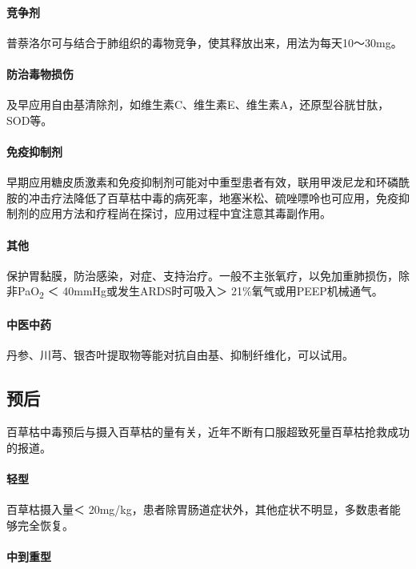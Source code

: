 \paragraph{竞争剂}

普萘洛尔可与结合于肺组织的毒物竞争，使其释放出来，用法为每天10～30mg。

\paragraph{防治毒物损伤}

及早应用自由基清除剂，如维生素C、维生素E、维生素A，还原型谷胱甘肽，SOD等。

\paragraph{免疫抑制剂}

早期应用糖皮质激素和免疫抑制剂可能对中重型患者有效，联用甲泼尼龙和环磷酰胺的冲击疗法降低了百草枯中毒的病死率，地塞米松、硫唑嘌呤也可应用，免疫抑制剂的应用方法和疗程尚在探讨，应用过程中宜注意其毒副作用。

\paragraph{其他}

保护胃黏膜，防治感染，对症、支持治疗。一般不主张氧疗，以免加重肺损伤，除非PaO\textsubscript{2}
＜ 40mmHg或发生ARDS时可吸入＞ 21\%氧气或用PEEP机械通气。

\paragraph{中医中药}

丹参、川芎、银杏叶提取物等能对抗自由基、抑制纤维化，可以试用。

\subsection{预后}

百草枯中毒预后与摄入百草枯的量有关，近年不断有口服超致死量百草枯抢救成功的报道。

\paragraph{轻型}

百草枯摄入量＜
20mg/kg，患者除胃肠道症状外，其他症状不明显，多数患者能够完全恢复。

\paragraph{中到重型}

